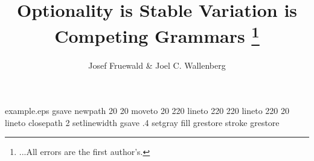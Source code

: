 %
%
%
%
%
\begin{filecontents*}{example.eps}
gsave
newpath
  20 20 moveto
  20 220 lineto
  220 220 lineto
  220 20 lineto
closepath
2 setlinewidth
gsave
  .4 setgray fill
grestore
stroke
grestore
\end{filecontents*}
%
\RequirePackage{fix-cm}
%
\documentclass{svjour3}                     %
%
\smartqed  %
%
\usepackage{mhsetup}
\usepackage{amsmath}
\usepackage{mathtools}
\usepackage{natbib}
\usepackage{graphicx}
\usepackage{float}
\usepackage{qtree}
\usepackage[utf8]{inputenc}
\usepackage{gb4e}
\usepackage[T1]{fontenc}
\newcommand{\noteme}[1]{\noindent \textbf{[[JCW:  #1 ]]}}
\renewcommand{\theequation}{\Alph{equation}}




\title{Optionality is Stable Variation is Competing Grammars
\thanks{...All errors are the first author's.}}


\author{Josef Fruewald \& Joel C. Wallenberg}



